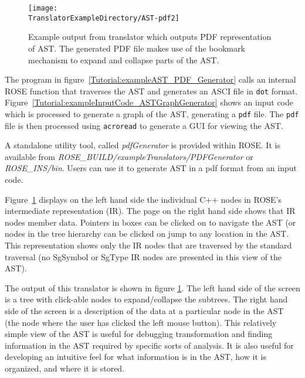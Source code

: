 \begin{figure}
\texttt{[image: \\TranslatorExampleDirectory/AST-pdf2]}
\caption{Example output from translator which outputs PDF representation of AST. The
    generated PDF file makes use of the bookmark mechanism to expand and collapse 
    parts of the AST.}
\label{tutorial:exampleOutputCodePDF}
\end{figure}

The program in figure~\ref{Tutorial:exampleAST_PDF_Generator} calls 
an internal ROSE function that traverses the AST and generates 
an ASCI file in {\tt dot} format.
Figure~\ref{Tutorial:exampleInputCode_ASTGraphGenerator} shows an input
code which is processed to generate a graph of the AST, generating a 
{\tt pdf} file.   The {\tt pdf} file is then processed
using {\tt acroread} to generate a GUI for viewing the AST.

A standalone utility tool, called \textit{pdfGenerator} is provided within
ROSE. It is available from
\textit{ROSE\_BUILD/exampleTranslators/PDFGenerator} or
\textit{ROSE\_INS/bin}. Users can use it to generate AST in a pdf format
from an input code.

   Figure~\ref{tutorial:exampleOutputCodePDF} displays on the left hand side the individual
C++ nodes in ROSE's intermediate representation (IR).  The page on the right hand side
shows that IR nodes member data. Pointers in boxes can be clicked on to navigate the AST
(or nodes in the tree hierarchy can be clicked on jump to any location in the AST.
This representation shows only the IR nodes that are traversed by the standard traversal
(no SgSymbol or SgType IR nodes are presented in this view of the AST).

The output of this translator is shown in figure \ref{tutorial:exampleOutputCodePDF}.  The left hand side
of the screen is a tree with click-able nodes to expand/collapse the subtrees.
The right hand side of the screen is a description of the data at a particular 
node in the AST (the node where the user has clicked the left mouse button).
This relatively simple view of the AST is useful for debugging transformation and finding
information in the AST required by specific sorts of analysis.  It is also useful
for developing an intuitive feel for what information is in the AST, how it is organized, 
and where it is stored.

